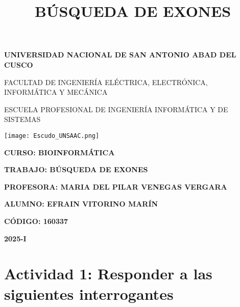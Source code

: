 \documentclass[fleqn,10pt]{article}
\title{\textbf{\Huge BÚSQUEDA DE EXONES}}
\begin{document}
\begin{titlepage}
    \centering
    \vspace*{1cm} %
    {\LARGE \textbf{UNIVERSIDAD NACIONAL DE SAN ANTONIO ABAD DEL CUSCO} \par}
    \vspace{0.5cm}
    {\Large FACULTAD DE INGENIERÍA ELÉCTRICA, ELECTRÓNICA, INFORMÁTICA Y MECÁNICA \par}
    \vspace{0.5cm}
    {\Large ESCUELA PROFESIONAL DE INGENIERÍA INFORMÁTICA Y DE SISTEMAS \par}
    \vfill
    \texttt{[image: Escudo\_UNSAAC.png]}  
    
    {\Large \textbf{CURSO: BIOINFORMÁTICA} \par}
    \vspace{0.5cm}
    {\Large \textbf{TRABAJO: BÚSQUEDA DE EXONES} \par}
    
    \vspace{0.5cm}
    {\Large \textbf{PROFESORA: MARIA DEL PILAR VENEGAS VERGARA} \par}
    \vspace{1cm}

    {\Large \textbf{ALUMNO: EFRAIN VITORINO MARÍN } \par}
    \vspace{0.5cm}
    {\Large \textbf{CÓDIGO: 160337} \par}
    \vfill

    {\Large \textbf{2025-I} \par}
    \vspace{1cm}
\end{titlepage}

\flushbottom
\maketitle
\thispagestyle{empty}

\section*{Actividad 1: Responder a las siguientes interrogantes}
\end{document}
